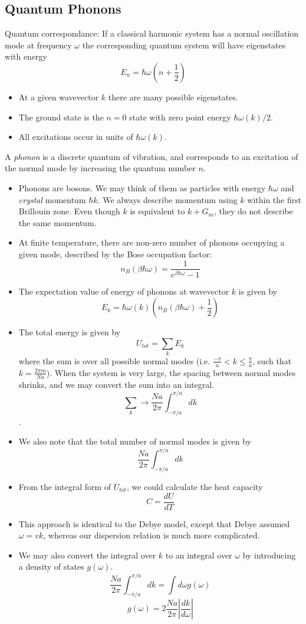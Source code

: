 \documentclass[10pt]{article}
\begin{document}
\subsection{Quantum Phonons}
Quantum correspondance: If a classical harmonic system has a normal oscillation mode at frequency $\omega$ the corresponding
quantum system will have eigenstates with energy
$$E_{n} = \hbar \omega (n + \frac{1}{2})$$
\begin{itemize}
\item At a given wavevector $k$ there are many possible eigenstates.
\item The ground state is the $n = 0$ state with zero point energy $\hbar \omega(k)/2$.
\item All excitations occur in units of $\hbar \omega(k)$.
\end{itemize}
A \emph{phonon} is a discrete quantum of vibration, and corresponds to an excitation of the normal mode by increasing the
quantum number $n$.
\begin{itemize}
  \item Phonons are bosons. We may think of them as particles with energy $\hbar \omega$ and \emph{crystal} momentum $\hbar k$. We always describe
  momentum using $k$ within the first Brillouin zone. Even though $k$ is equivalent to $k + G_{m}$, they do not describe the same momentum.
  \item At finite temperature, there are non-zero number of phonons occupying a given mode, described by the Bose occupation factor:
  $$n_{B}(\beta \hbar \omega) = \frac{1}{e^{\beta \hbar \omega} - 1}$$
  \item The expectation value of energy of phonons at wavevector $k$ is given by
  $$E_{k} = \hbar \omega(k) \left (n_{B}(\beta \hbar \omega) + \frac{1}{2} \right )$$
  \item The total energy is given by
  $$U_{tot} = \sum_{k} E_{k}$$
  where the sum is over all possible normal modes (i.e. $\frac{-\pi}{a} < k \leq \frac{\pi}{a}$, such that $k = \frac{2\pi m}{Na}$).
  When the system is very large, the spacing between normal modes shrinks, and we may convert the sum into an integral.
  $$\sum_{k} \rightarrow \frac{Na}{2\pi}\int_{-\pi/a}^{\pi/a}dk$$.
  \item We also note that the total number of normal modes is given by
  $$\frac{Na}{2\pi}\int_{-\pi/a}^{\pi/a}dk$$
  \item From the integral form of $U_{tot}$, we could calculate the heat capacity
  $$C = \frac{dU}{dT}$$
  \item This approach is identical to the Debye model, except that Debye assumed $\omega = vk$, whereas our dispersion
  relation is much more complicated.
  \item We may also convert the integral over $k$ to an integral over $\omega$ by introducing a density of states $g(\omega)$.
  $$\frac{Na}{2\pi}\int_{-\pi/a}^{\pi/a}dk = \int d\omega g(\omega)$$
  $$g(\omega) = 2 \frac{Na}{2\pi}\left | \frac{dk}{d\omega}\right |$$
\end{itemize}
\end{document}
